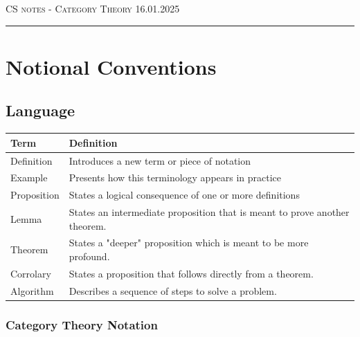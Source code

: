 \documentclass[10pt]{article}
\begin{document}
\thispagestyle{empty}

{\scshape CS } \hfill {\scshape \large notes - Category Theory} \hfill {\scshape 16.01.2025}

\smallskip
\hrule
\bigskip

\section{Notional Conventions}

\subsection{Language}

\begin{center}
  \begin{longtable}{|p{}|p{}|}
    \hline 
    \textbf{Term} & \textbf{Definition} \\ \hline 
    Definition & Introduces a new term or piece of notation \\ \hline
    Example & Presents how this terminology appears in practice \\ \hline
    Proposition & States a logical consequence of one or more definitions \\ \hline
    Lemma & States an intermediate proposition that is meant to prove another theorem. \\ \hline
    Theorem & States a "deeper" proposition which is meant to be more profound. \\ \hline
    Corrolary & States a proposition that follows directly from a theorem. \\ \hline
    Algorithm & Describes a sequence of steps to solve a problem. \\ \hline
  \end{longtable}
\end{center}

\subsubsection{Category Theory Notation}
\end{document}
